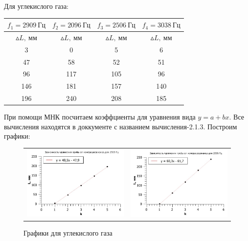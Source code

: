 \documentclass[12pt,a4paper]{article}
\begin{document}
Для углекислого газа:

\begin{tabular}{|c|c|c|c|}
\hline 
$f_1 = 2909 \: \textit{Гц}$ & $f_2 = 2096 \: \textit{Гц}$ & $f_3 = 2506 \: \textit{Гц}$ & $f_4 = 3038 \: \textit{Гц}$ \\ 
\hline 
$\vartriangle L, \: \textit{мм}$ & $\vartriangle L, \: \textit{мм}$ & $\vartriangle L, \: \textit{мм}$ & $\vartriangle L, \: \textit{мм}$ \\ 
\hline 
3 & 0 & 5 & 6 \\ 
\hline 
47 & 58 & 52 & 51 \\ 
\hline 
96 & 117 & 105 & 96 \\ 
\hline 
146& 181 & 157& 140 \\ 
\hline 
196 & 240 & 208 & 185 \\ 
\hline
\end{tabular} 

\vspace{0.5cm}

При помощи МНК посчитаем коэффциенты для уравнения вида $y = a + bx$. Все вычисления находятся в доккументе с названием вычисления-2.1.3. Построим графики:

\vspace{0.5cm}

\begin{figure}[ht]\center
\begin{tabular}{cc}
\includegraphics[width=60mm]{CO2_1-1.jpg}
&
\includegraphics[width=60mm]{CO2_2-1.jpg}
\end{tabular}
\caption{Графики для углекислого газа}
\end{figure}
\end{document}
